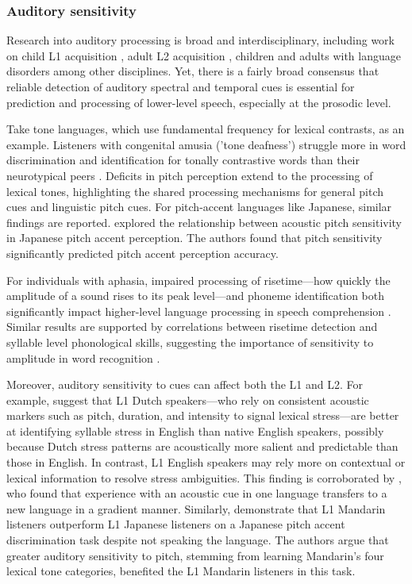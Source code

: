 \subsubsection{Auditory sensitivity}
Research into auditory processing is broad and interdisciplinary, including work on child L1 acquisition \citep{benasich2002infant}, adult L2 acquisition \citep{lengeris2010effect, kempe2012individual}, children and adults with language disorders \citep{goswami2013impaired} among other disciplines. Yet, there is a fairly broad consensus that reliable detection of auditory spectral and temporal cues is essential for prediction and processing of lower-level speech, especially at the prosodic level. 

Take tone languages, which use fundamental frequency for lexical contrasts, as an example. Listeners with congenital amusia ('tone deafness') struggle more in word discrimination and identification for tonally contrastive words than their neurotypical peers \citep{nan_2010, zhu2023tone}. Deficits in pitch perception extend to the processing of lexical tones, highlighting the shared processing mechanisms for general pitch cues and linguistic pitch cues. For pitch-accent languages like Japanese, similar findings are reported. \cite{goss_2014} explored the relationship between acoustic pitch sensitivity in Japanese pitch accent perception. The authors found that pitch sensitivity significantly predicted pitch accent perception accuracy.

For individuals with aphasia, impaired processing of risetime---how quickly the amplitude of a sound rises to
its peak level---and phoneme identification both significantly impact higher-level language processing in speech comprehension \citep{Kries2023}. Similar results are supported by correlations between risetime detection and syllable level phonological skills, suggesting the importance of sensitivity to amplitude in word recognition \citep{Hamalaine2005}. 

Moreover, auditory sensitivity to cues can affect both the L1 and L2. For example, \cite{cutler2007dutch} suggest that L1 Dutch speakers—who rely on consistent acoustic markers such as pitch, duration, and intensity to signal lexical stress—are better at identifying syllable stress in English than native English speakers, possibly because Dutch stress patterns are acoustically more salient and predictable than those in English. In contrast, L1 English speakers may rely more on contextual or lexical information to resolve stress ambiguities. This finding is corroborated by \cite{Pajak2014}, who found that experience with an acoustic cue in one language transfers to a new language in a gradient manner. Similarly, \cite{wienergoss} demonstrate that L1 Mandarin listeners outperform L1 Japanese listeners on a Japanese pitch accent discrimination task despite not speaking the language. The authors argue that greater auditory sensitivity to pitch, stemming from learning Mandarin’s four lexical tone categories, benefited the L1 Mandarin listeners in this task.

